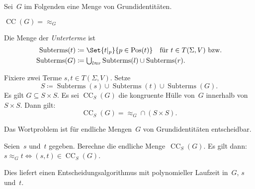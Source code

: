 \documentclass{cheat-sheet}
\DeclareMathOperator{\Pos}{Pos} %
\newcommand{\ident}{\approx} %
\DeclareMathOperator{\CongClos}{CC} %
\DeclareMathOperator{\Subterms}{Subterms} %
\begin{document}
\begin{nota}
  Sei~$G$ im Folgenden eine Menge von Grundidentitäten.
\end{nota}

\begin{lem}
  $\CongClos(G) = {\ident_G}$
\end{lem}

\begin{defn}
  Die Menge der \emph{Unterterme} ist
  \begin{align*}
    \Subterms(t) & \coloneqq \Set{t|_p}{p \in \Pos(t)} \quad \text{für $t \in T(\Sigma, V)$ bzw.} \\
    \Subterms(G) & \coloneqq {\bigcup}_{l \ident r} \Subterms(l) \cup \Subterms(r).
  \end{align*}
\end{defn}


\begin{thm}
  Fixiere zwei Terme $s, t \in T(\Sigma, V)$.
  Setze
  \[
    S \coloneqq \Subterms(s) \cup \Subterms(t) \cup \Subterms(G).
  \]
  Es gilt $G \subseteq S \times S$.
  Es sei $\CongClos_S(G)$ die kongruente Hülle von~$G$ innerhalb von~$S \times S$.
  Dann gilt:
  \[
    \CongClos_S(G) = {\ident_G} \cap (S \times S).
  \]
\end{thm}

\begin{kor}
  Das Wortproblem ist für endliche Mengen~$G$ von Grundidentitäten entscheidbar.
\end{kor}

\begin{beweisidee}
  Seien~$s$ und~$t$ gegeben. Berechne die endliche Menge~$\CongClos_S(G)$.
  Es gilt dann:
  $s \ident_G t \iff (s, t) \in \CongClos_S(G)$.
\end{beweisidee}

\begin{bem}
  Dies liefert einen Entscheidungsalgorithmus mit polynomieller Laufzeit in~$G$, $s$ und~$t$.
\end{bem}

\end{document}
